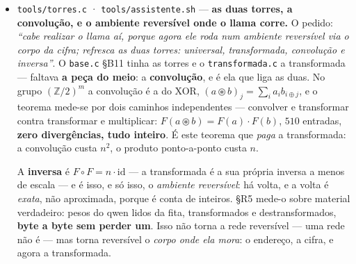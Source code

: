 \documentclass[11pt]{article}
\newcommand{\code}[1]{\texttt{\small #1}}
\theoremstyle{plain}
\theoremstyle{remark}
\begin{document}
\begin{itemize}
\emph{E o plugue, que se mandou alinhar --- ``é finito, só alinhar a túnica; não tem cálculo, é
desdobrar o espaço''.} dequantizava para \code{float} e somava em \code{double}, o que
\textbf{introduz} o erro que depois andei a perseguir. Desdobrar é tirar as escalas de dentro do
somatório: $\sum w_ix_i = \sum_{\text{sub}}[\,d\!\cdot\!s(\sum q_ix_i) - d_{\min}\!\cdot\!m(\sum x_i)\,]$,
com o peso nunca reconstruído. \emph{Mas a primeira tentativa quantizou também a ativação} --- ficou
$3{,}4\times$ mais rápida e desalinhou a saída, e a medida disse porquê: os caminhos separavam-se
$0{,}48\%$, a ordem das margens de decisão. Tirada a quantização da ativação, os dois caminhos dão
\textbf{$0{,}0000\%$} de diferença, o texto volta a bater com o ollama, e ainda assim fica $\sim2\times$
mais rápido. \emph{O erro não vinha do desdobramento; vinha de se ter quantizado o que não precisava.}

\emph{E uma armadilha do oráculo, que vale por si:} o ollama aplica \code{repeat\_penalty 1.1} por
omissão mesmo a temperatura $0$. Ele dizia ``The country'' e nós ``The capital'' --- e a diferença
não era nossa: \emph{``capital'' está no prompt}, logo era penalizado. Comparar contra um oráculo sem
saber o que ele faz mede a configuração dele, não o nosso trabalho.

\item \code{tools/torres.c} · \code{tools/assistente.sh} --- \textbf{as duas torres, a convolução, e
o ambiente reversível onde o llama corre.} O pedido: \emph{``cabe realizar o llama aí, porque agora
ele roda num ambiente reversível via o corpo da cifra; refresca as duas torres: universal,
transformada, convolução e inversa''}. O \code{base.c} §B11 tinha as torres e o
\code{transformada.c} a transformada --- faltava \textbf{a peça do meio}: a
\textbf{convolução}, e é ela que liga as duas. No grupo $(\mathbb{Z}/2)^m$ a convolução é a do XOR,
$(a\circledast b)_j=\sum_i a_i b_{i\oplus j}$, e o teorema mede-se por dois caminhos independentes
--- convolver e transformar contra transformar e multiplicar: $F(a\circledast b)=F(a)\cdot F(b)$,
$510$ entradas, \textbf{zero divergências, tudo inteiro}. É este teorema que \emph{paga} a
transformada: a convolução custa $n^2$, o produto ponto-a-ponto custa $n$.

A \textbf{inversa} é $F\!\circ\!F = n\cdot\mathrm{id}$ --- a transformada é a sua própria inversa a
menos de escala --- e é isso, e só isso, o \emph{ambiente reversível}: há volta, e a volta é
\emph{exata}, não aproximada, porque é conta de inteiros. §R5 mede-o sobre material verdadeiro:
pesos do qwen lidos da fita, transformados e destransformados, \textbf{byte a byte sem perder um}.
Isso não torna a rede reversível --- uma rede não é --- mas torna reversível o \emph{corpo onde ela
mora}: o endereço, a cifra, e agora a transformada.


\end{itemize}
\end{document}
